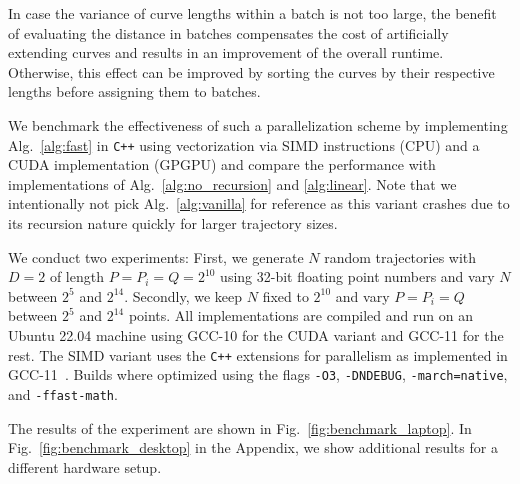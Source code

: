 In case the variance of curve lengths within a batch is not too large, the benefit of evaluating the distance in batches compensates the cost of artificially extending curves and results in an improvement of the overall runtime.
Otherwise, this effect can be improved by sorting the curves by their respective lengths before assigning them to batches.

We benchmark the effectiveness of such a parallelization scheme by implementing Alg.~\ref{alg:fast} in \texttt{C++} using vectorization via SIMD instructions (CPU) and a CUDA implementation (GPGPU) and compare the performance with implementations of Alg.~\ref{alg:no_recursion} and \ref{alg:linear}.
Note that we intentionally not pick Alg.~\ref{alg:vanilla} for reference as this variant crashes due to its recursion nature quickly for larger trajectory sizes.

We conduct two experiments:
First, we generate $N$ random trajectories with $D=2$ of length $P = P_i = Q = 2^{10}$ using 32-bit floating point numbers and vary $N$ between $2^5$ and $2^{14}$.
Secondly, we keep $N$ fixed to $2^{10}$ and vary $P = P_i = Q$ between $2^5$ and $2^{14}$ points.
All implementations are compiled and run on an Ubuntu 22.04 machine using GCC-10 for the CUDA variant and GCC-11 for the rest.
The SIMD variant uses the \texttt{C++} extensions for parallelism as implemented in GCC-11~\citep{N4808}.
Builds where optimized using the flags \texttt{-O3}, \texttt{-DNDEBUG}, \texttt{-march=native}, and \texttt{-ffast-math}.

The results of the experiment are shown in Fig.~\ref{fig:benchmark_laptop}.
In Fig.~\ref{fig:benchmark_desktop} in the Appendix, we show additional results for a different hardware setup.

